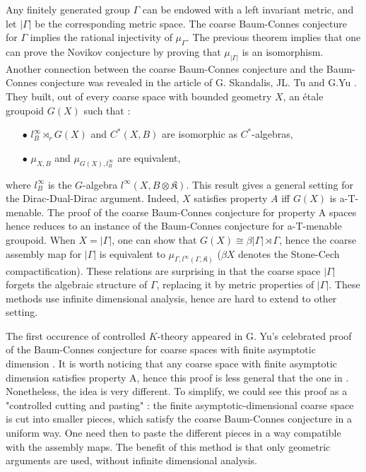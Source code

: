 Any finitely generated group $\Gamma$ can be endowed with a left invariant metric, and let $|\Gamma|$ be the corresponding metric space. The coarse Baum-Connes conjecture for $\Gamma$ implies the rational injectivity of $\mu_\Gamma$. The previous theorem implies that one can prove the Novikov conjecture by proving that $\mu_{|\Gamma|}$ is an isomorphism. \\

Another connection between the coarse Baum-Connes conjecture and the Baum-Connes conjecture was revealed in the article of G. Skandalis, JL. Tu and G.Yu \cite{SkTuYu}. They built, out of every coarse space with bounded geometry $X$, an étale groupoid $G(X)$ such that :\\
\begin{itemize}
\item[$\bullet$] $l^\infty_B \rtimes_r G(X)$ and $C^*(X,B)$ are isomorphic as $C^*$-algebras,
\item[$\bullet$] $\mu_{X,B}$ and $\mu_{G(X),l^\infty_B}$ are equivalent,\\
\end{itemize}
where $l^\infty_B$ is the $G$-algebra $l^\infty(X,B\otimes\mathfrak K)$. This result gives a general setting for the Dirac-Dual-Dirac argument. Indeed, $X$ satisfies property $A$ iff $G(X)$ is a-T-menable. The proof of the coarse Baum-Connes conjecture for property A spaces hence reduces to an instance of the Baum-Connes conjecture for a-T-menable groupoid. When $X=|\Gamma|$, one can show that $G(X) \cong \beta |\Gamma| \rtimes \Gamma$, hence the coarse assembly map for $|\Gamma|$ is equivalent to $\mu_{\Gamma,l^\infty(\Gamma, \mathfrak K)}$ \cite{SkTuYu} ($\beta X$ denotes the Stone-Cech compactification). These relations are surprising in that the coarse space $|\Gamma|$ forgets the algebraic structure of $\Gamma$, replacing it by metric properties of $|\Gamma|$. These methods use infinite dimensional analysis, hence are hard to extend to other setting. %

The first occurence of controlled $K$-theory appeared in G. Yu's celebrated proof of the Baum-Connes conjecture for coarse spaces with finite asymptotic dimension \cite{Yu1}. It is worth noticing that any coarse space with finite asymptotic dimension satisfies property A, hence this proof is less general that the one in \cite{Yu2}. Nonetheless, the idea is very different. To simplify, we could see this proof as a "controlled cutting and pasting" : the finite asymptotic-dimensional coarse space is cut into smaller pieces, which satisfy the coarse Baum-Connes conjecture in a uniform way. One need then to paste the different pieces in a way compatible with the assembly maps. The benefit of this method is that only geometric arguments are used, without infinite dimensional analysis. \\ %

